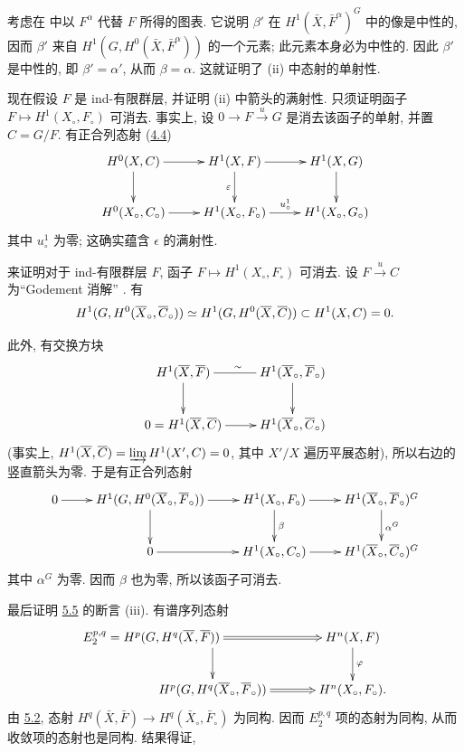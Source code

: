 考虑在  中以 $F^{\alpha}$ 代替 $F$ 所得的图表. 它说明 $\beta'$ 在 $H^1(\bar X,\bar F^{\alpha})^G$ 中的像是中性的, 因而 $\beta'$ 来自 $H^1(G,H^0(\bar X,\bar F^{\alpha}))$ 的一个元素; 此元素本身必为中性的. 因此 $\beta'$ 是中性的, 即 $\beta'=\alpha'$, 从而 $\beta=\alpha$. 这就证明了 (ii) 中态射的单射性.

现在假设 $F$ 是 ind-有限群层, 并证明 (ii) 中箭头的满射性. 只须证明函子 $F\mapsto H^1(X_{\circ},F_{\circ})$ 可消去. 事实上, 设 $0\longrightarrow F\xrightarrow{u}G$ 是消去该函子的单射, 并置 $C=G/F$. 有正合列态射 (\hyperref[XII.prop4.4]{4.4})
$$
\xymatrix{
H^0(X,C) \ar[r]\ar[d] & H^1(X,F) \ar[d]_{\epsilon}\ar[r] &
H^1(X,G) \ar[d]\\
H^0(X_{\circ},C_{\circ}) \ar[r] &
H^1(X_{\circ},F_{\circ}) \ar[r]^{u_{\circ}^1} &
H^1(X_{\circ},G_{\circ})
}
$$
其中 $u_{\circ}^1$ 为零; 这确实蕴含 $\epsilon$ 的满射性.

来证明\pageoriginale 对于 ind-有限群层 $F$, 函子 $F\mapsto H^1(X_{\circ},F_{\circ})$ 可消去. 设 $F\xrightarrow{u}C$ 为“Godement 消解” . 有
$$
H^1(G,H^0(\bar X_{\circ},\bar C_{\circ}))\simeq
H^1(G,H^0(\bar X,\bar C))\subset H^1(X,C)=0{\quoi}.
$$

此外, 有交换方块
$$
\xymatrix{
H^1(\bar X,\bar F) \ar@{-}[r]^{\sim}\ar[d] &
H^1(\bar X_{\circ},\bar F_{\circ})\ar[d]\\
0=H^1(\bar X,\bar C) \ar[r] &
H^1(\bar X_{\circ},\bar C_{\circ})
}
$$
(事实上, $H^1(\bar X,\bar C)=\varinjlim H^1(X',C)=0$, 其中 $X'/X$ 遍历平展态射), 所以右边的竖直箭头为零. 于是有正合列态射
$$
\xymatrix{
0 \ar[r] & H^1(G,H^0(\bar X_{\circ},\bar F_{\circ}))
\ar[r]\ar[d] & H^1(X_{\circ},F_{\circ}) \ar[r]\ar[d]^{\beta} &
H^1(\bar X_{\circ},\bar F_{\circ})^G \ar[d]^{\alpha^G}\\
&0 \ar[r] & H^1(X_{\circ},C_{\circ}) \ar[r] &
H^1(\bar X_{\circ},\bar C_{\circ})^G
}
$$
其中 $\alpha^G$ 为零. 因而 $\beta$ 也为零, 所以该函子可消去.

最后证明 \hyperref[XII.cor5.5]{5.5} 的断言 (iii). 有谱序列态射
$$
\xymatrix{
**[l]E_2^{p,q}=H^p(G,H^q(\bar X,\bar F))
\ar@{=>}[r]\ar[d] & H^n(X,F)\ar[d]^{\varphi}\\
H^p(G,H^q(\bar X_{\circ},\bar F_{\circ}))
\ar@{=>}[r] & H^n(X_{\circ},F_{\circ}).
}
$$
由 \hyperref[XII.cor5.2]{5.2}, 态射 $H^q(\bar X,\bar F)\longrightarrow
H^q(\bar X_{\circ},\bar F_{\circ})$ 为同构. 因而 $E_2^{p,q}$ 项的态射为同构, 从而收敛项的态射也是同构. 结果得证, \cqfd

\setcounter{subsection}{5}
